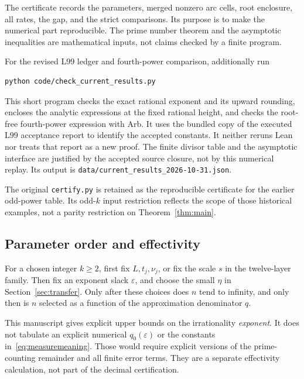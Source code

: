 The certificate records the parameters, merged nonzero arc cells,
root enclosure, all rates, the gap, and the strict comparisons.
Its purpose is to make the numerical part reproducible.
The prime number theorem and the asymptotic inequalities are
mathematical inputs, not claims checked by a finite program.

For the revised L99 ledger and fourth-power comparison, additionally run
\begin{verbatim}
python code/check_current_results.py
\end{verbatim}
This short program checks the exact rational exponent and its upward
rounding, encloses the analytic expressions at the fixed rational
height, and checks the root-free fourth-power expression with Arb.
It uses the bundled copy of the executed L99 acceptance report to
identify the accepted constants. It neither reruns Lean nor treats
that report as a new proof. The finite divisor table and the
asymptotic interface are justified by the accepted source closure,
not by this numerical replay. Its output is
\texttt{data/current\_results\_2026-10-31.json}.

The original \texttt{certify.py} is retained as the reproducible
certificate for the earlier odd-power table. Its odd-\(k\) input
restriction reflects the scope of those historical examples, not a
parity restriction on Theorem~\ref{thm:main}.

\subsection{Parameter order and effectivity}

For a chosen integer \(k\ge2\), first fix \(L,t_j,\nu_j\), or fix the scale
\(s\) in the twelve-layer family. Then fix an exponent slack
\(\varepsilon\), and choose the small \(\eta\) in
Section~\ref{sec:transfer}. Only after these choices does \(n\)
tend to infinity, and only then is \(n\) selected as a function of
the approximation denominator \(q\).

This manuscript gives explicit upper bounds on the irrationality
\emph{exponent}. It does not tabulate an explicit numerical
\(q_0(\varepsilon)\) or the constants in~\eqref{eq:measuremeaning}.
Those would require explicit versions of the prime-counting
remainder and all finite error terms. They are a separate
effectivity calculation, not part of the decimal certification.

